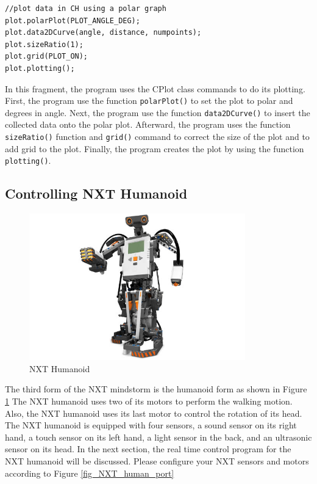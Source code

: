 \documentclass[11pt]{article}
\begin{document}
\begin{verbatim}
//plot data in CH using a polar graph
plot.polarPlot(PLOT_ANGLE_DEG);
plot.data2DCurve(angle, distance, numpoints);
plot.sizeRatio(1);
plot.grid(PLOT_ON); 
plot.plotting();
\end{verbatim}

In this fragment, the program uses the CPlot class commands to do its plotting.
First, the program use the function \verb+polarPlot()+ to set the plot to polar and degrees in angle.
Next, the program use the function \verb+data2DCurve()+ to insert the collected data onto the polar plot.
Afterward, the program uses the function \verb+sizeRatio()+ function and \verb+grid()+ command to
correct the size of the plot and to add grid to the plot. Finally, the program creates the plot by using 
the function \verb+plotting()+.

\clearpage
\newpage
\subsection{Controlling NXT Humanoid}
\begin{figure}[ht]
  \begin{center}
    \includegraphics[height=2.5in]{figure/mindstorm/NXT_humanoid.png}
    \caption{NXT Humanoid \label{fig_NXT_humanoid}}
  \end{center}
\end{figure}

\noindent
The third form of the NXT mindstorm is the humanoid form as shown in Figure \ref{fig_NXT_humanoid}
The NXT humanoid uses two of its motors to perform the walking motion. Also, the NXT humanoid uses 
its last motor to control the rotation of its head. The NXT humanoid is equipped with four sensors, 
a sound sensor on its right hand, a touch sensor on its left hand, a light sensor in the back, and 
an ultrasonic sensor on its head. In the next section, the real time control program for the NXT 
humanoid will be discussed. Please configure your NXT sensors and motors according to Figure 
\ref{fig_NXT_human_port}
\end{document}
